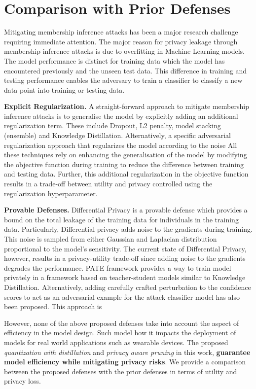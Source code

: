 \section{Comparison with Prior Defenses}\label{compare}

Mitigating membership inference attacks has been a major research challenge requiring immediate attention.
The major reason for privacy leakage through membership inference attacks is due to overfitting in Machine Learning models.
The model performance is distinct for training data which the model has encountered previously and the unseen test data.
This difference in training and testing performance enables the adversary to train a classifier to classify a new data point into training or testing data.


\textbf{Explicit Regularization.} A straight-forward approach to mitigate membership inference attacks is to generalise the model by explicitly adding an additional regularization term.
These include Dropout, L2 penalty, model stacking (ensemble) and Knowledge Distillation.
Alternatively, a specific adversarial regularization approach that regularizes the model according to the noise
All these techniques rely on enhancing the generalisation of the model by modifying the objective function during training to reduce the difference between training and testing data.
Further, this additional regularization in the objective function results in a trade-off between utility and privacy controlled using the regularization hyperparameter.


\textbf{Provable Defenses.} Differential Privacy is a provable defense which provides a bound on the total leakage of the training data for individuals in the training data.
Particularly, Differential privacy adds noise to the gradients during training. This noise is sampled from either Gaussian and Laplacian distribution proportional to the model's sensitivity.
The current state of Differential Privacy, however, results in a privacy-utility trade-off  since adding noise to the gradients degrades the performance.
PATE framework provides a way to train model privately in a framework based on teacher-student models similar to Knowledge Distillation.
Alternatively, adding carefully crafted perturbation to the confidence scores to act as an adversarial example for the attack classifier model has also been proposed.
This approach is 


However, none of the above proposed defenses take into account the aspect of efficiency in the model design.
Such model how it impacts the deployment of models for real world applications such as wearable devices.
The proposed \textit{quantization with distillation} and \textit{privacy aware pruning} in this work, \textbf{guarantee model efficiency while mitigating privacy risks}.
We provide a comparison between the proposed defenses with the prior defenses in terms of utility and privacy loss.
